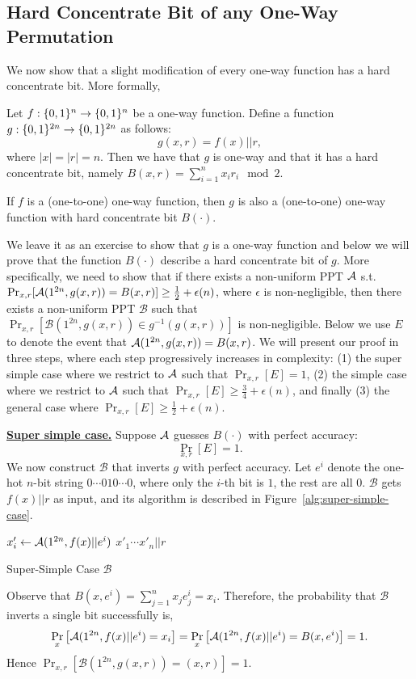 \subsection{Hard Concentrate Bit of any One-Way Permutation}
We now show that a slight modification of every one-way function has a hard concentrate bit. More formally,
\begin{theorem}\label{thm:hard-concentrate-bit}
Let  $f:\{0,1\}^{n} \rightarrow \{0,1\}^{n}$ be a one-way function.
Define a function $g:\{0,1\}^{2n} \rightarrow \{0,1\}^{2n}$ as follows:
$$g(x,r) = f(x) || r,$$
where $|x| = |r| =n$. Then we have that $g$ is one-way and that it has a hard concentrate bit, namely $B(x, r) = \sum_{i=1}^n x_i r_i\mod 2$.
\end{theorem}
\begin{remark}
If $f$ is a (one-to-one) one-way function, then $g$ is also a (one-to-one) one-way function with hard concentrate bit $B(\cdot)$.
\end{remark}
\proof
We leave it as an exercise to show that $g$ is a one-way function and below we will prove that the function $B(\cdot)$ describe a hard concentrate bit of $g$.
More specifically, we need to show that if there exists a non-uniform PPT  $\mathcal{A}$ s.t. $\Pr_{x,r}[\mathcal{A}(1^{2n},g(x,r)) = B(x,r)] \ge \frac{1}{2} + \epsilon(n)$, where $\epsilon$ is non-negligible, then there exists a non-uniform PPT $\mathcal{B}$ such that $\Pr_{x,r}[\mathcal{B}(1^{2n}, g(x,r)) \in g^{-1}(g(x,r))]$ is non-negligible.
Below we use $E$ to denote the event that $\mathcal{A}(1^{2n},g(x,r)) = B(x,r)$.
We will present our proof in three steps, where each step progressively increases in complexity:
(1) the super simple case where we restrict to $\mathcal{A}$ such that $\Pr_{x,r}[E] = 1$,
(2) the simple case where we restrict to $\mathcal{A}$ such that $\Pr_{x,r}[E] \geq \frac34 + \epsilon(n)$,
and finally (3) the general case where $\Pr_{x,r}[E] \geq \frac12 + \epsilon(n)$.

\medskip
\noindent\textbf{\underline{Super simple case.}}
Suppose $\mathcal{A}$ guesses $B(\cdot)$ with perfect accuracy:
$$\Pr_{x,r}[E] =1.$$
We now construct $\mathcal{B}$ that inverts $g$ with perfect accuracy.
Let $e^i$ denote the one-hot $n$-bit string $0\cdots 0 1 0 \cdots0$, where only the $i$-th bit is $1$, the rest are all $0$.
$\mathcal{B}$ gets $f(x)||r$ as input, and its algorithm is described in Figure~\ref{alg:super-simple-case}.

\begin{marginfigure}
\begin{algorithmic}
    \State $x'_i \gets \mathcal{A}(1^{2n}, f(x)||e^i)$
\EndFor
\State \Return $x'_1\cdots x'_n || r$
\end{algorithmic}
\caption{Super-Simple Case $\mathcal{B}$} \label{alg:super-simple-case}
\end{marginfigure}
Observe that $B(x,e^i) = \sum_{j=1}^n x_je^i_j = x_i$. Therefore, the probability that $\mathcal{B}$ inverts a single bit successfully is,
$$\Pr_{x}\left[\mathcal{A}(1^{2n}, f(x)||e^i)=x_i\right] =  \Pr_{x}\left[\mathcal{A}(1^{2n}, f(x)||e^i)=B(x,e^i)\right] = 1.$$
Hence $\Pr_{x,r}[\mathcal{B}(1^{2n}, g(x,r)) = (x,r)] = 1$.


